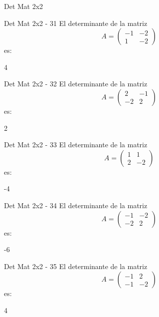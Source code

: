 \documentclass[a4,11pt]{aleph-notas}
\begin{document}
\begin{quiz}{Det Mat 2x2}
\begin{numerical}[tolerance=0]%
    {Det Mat 2x2 - 31}
    El determinante de la matriz
    \[
        A = \begin{pmatrix} -1 & -2 \\ 1 & -2 \end{pmatrix}
    \]
    es:
    \item[] 4
\end{numerical}

\begin{numerical}[tolerance=0]%
    {Det Mat 2x2 - 32}
    El determinante de la matriz
    \[
        A = \begin{pmatrix} 2 & -1 \\ -2 & 2 \end{pmatrix}
    \]
    es:
    \item[] 2
\end{numerical}

\begin{numerical}[tolerance=0]%
    {Det Mat 2x2 - 33}
    El determinante de la matriz
    \[
        A = \begin{pmatrix} 1 & 1 \\ 2 & -2 \end{pmatrix}
    \]
    es:
    \item[] -4
\end{numerical}

\begin{numerical}[tolerance=0]%
    {Det Mat 2x2 - 34}
    El determinante de la matriz
    \[
        A = \begin{pmatrix} -1 & -2 \\ -2 & 2 \end{pmatrix}
    \]
    es:
    \item[] -6
\end{numerical}

\begin{numerical}[tolerance=0]%
    {Det Mat 2x2 - 35}
    El determinante de la matriz
    \[
        A = \begin{pmatrix} -1 & 2 \\ -1 & -2 \end{pmatrix}
    \]
    es:
    \item[] 4
\end{numerical}


\end{quiz}
\end{document}
